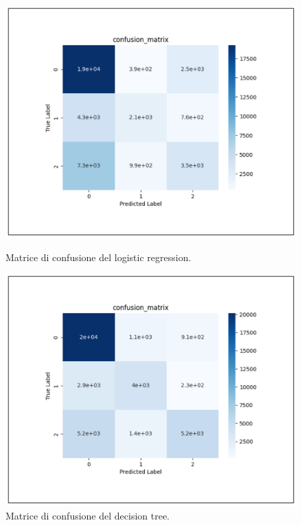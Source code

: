 \begin{figure}[t]
    \begin{multicols}{3}
        \centering
        \includegraphics[width=\linewidth]{img//6/3.png}
        \caption{Matrice di confusione del logistic regression.}
        \label{fig:6-3}
        
        \columnbreak
        
        \includegraphics[width=\linewidth]{img//6/4.png}
        \caption{Matrice di confusione del decision tree.}
        \label{fig:6-4}

        \columnbreak
        

\end{multicols}
\end{figure}
